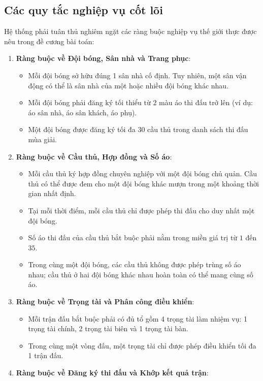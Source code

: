 \subsection{Các quy tắc nghiệp vụ cốt lõi}
Hệ thống phải tuân thủ nghiêm ngặt các ràng buộc nghiệp vụ thế giới thực được nêu trong đề cương bài toán:
\begin{enumerate}
    \item \textbf{Ràng buộc về Đội bóng, Sân nhà và Trang phục}:
    \begin{itemize}
        \item Mỗi đội bóng sở hữu đúng 1 sân nhà cố định. Tuy nhiên, một sân vận động có thể là sân nhà của một hoặc nhiều đội bóng khác nhau.
        \item Mỗi đội bóng phải đăng ký tối thiểu từ 2 màu áo thi đấu trở lên (ví dụ: áo sân nhà, áo sân khách, áo phụ).
        \item Một đội bóng được đăng ký tối đa 30 cầu thủ trong danh sách thi đấu mùa giải.
    \end{itemize}
    \item \textbf{Ràng buộc về Cầu thủ, Hợp đồng và Số áo}:
    \begin{itemize}
        \item Mỗi cầu thủ ký hợp đồng chuyên nghiệp với một đội bóng chủ quản. Cầu thủ có thể được đem cho một đội bóng khác mượn trong một khoảng thời gian nhất định.
        \item Tại mỗi thời điểm, mỗi cầu thủ chỉ được phép thi đấu cho duy nhất một đội bóng.
        \item Số áo thi đấu của cầu thủ bắt buộc phải nằm trong miền giá trị từ $1$ đến $35$.
        \item Trong cùng một đội bóng, các cầu thủ không được phép trùng số áo nhau; cầu thủ ở hai đội bóng khác nhau hoàn toàn có thể mang cùng số áo.
    \end{itemize}
    \item \textbf{Ràng buộc về Trọng tài và Phân công điều khiển}:
    \begin{itemize}
        \item Mỗi trận đấu bắt buộc phải có đủ tổ gồm 4 trọng tài làm nhiệm vụ: 1 trọng tài chính, 2 trọng tài biên và 1 trọng tài bàn.
        \item Trong cùng một vòng đấu, một trọng tài chỉ được phép điều khiển tối đa 1 trận đấu.
    \end{itemize}
    \item \textbf{Ràng buộc về Đăng ký thi đấu và Khớp kết quả trận}:

\end{enumerate}
